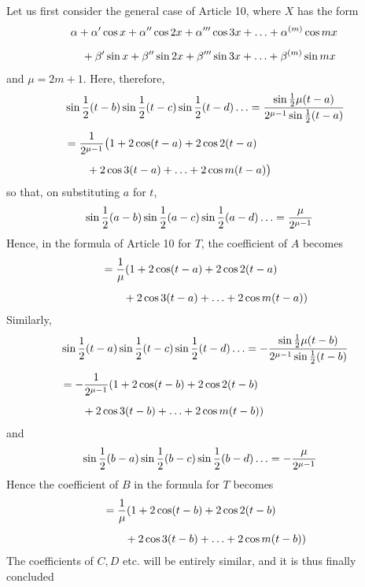 \begingroup
\renewcommand{\arraystretch}{1.45}
Let us first consider the general case of Article 10, where \(X\) has the form
\[
\begin{aligned}
&\alpha+\alpha'\cos x+\alpha''\cos2x+\alpha'''\cos3x+\mathinner{.\,.\,.}+\alpha^{(m)}\cos mx\\[5pt]
&\quad+\beta'\sin x+\beta''\sin2x+\beta'''\sin3x+\mathinner{.\,.\,.}+\beta^{(m)}\sin mx
\end{aligned}
\]
\noindent and \(\mu=2m+1\). Here, therefore,
\[
\begin{aligned}
&\sin\frac12(t-b)\sin\frac12(t-c)\sin\frac12(t-d)\mathinner{.\,.\,.}=\frac{\sin\frac12\mu(t-a)}{2^{\mu-1}\sin\frac12(t-a)}\\[5pt]
&=\frac{1}{2^{\mu-1}}\bigl(1+2\cos(t-a)+2\cos2(t-a)\\[5pt]&\qquad{}+2\cos3(t-a)+\mathinner{.\,.\,.}+2\cos m(t-a)\bigr)
\end{aligned}
\]
\noindent so that, on substituting \(a\) for \(t\),
\[
\begin{aligned}
&\sin\frac12(a-b)\sin\frac12(a-c)\sin\frac12(a-d)\mathinner{.\,.\,.}=\frac{\mu}{2^{\mu-1}}
\end{aligned}
\]
Hence, in the formula of Article 10 for \(T\), the coefficient of \(A\) becomes
\[
\begin{aligned}
&=\frac{1}{\mu}(1+2\cos(t-a)+2\cos2(t-a)\\[5pt]&\qquad{}+2\cos3(t-a)+\mathinner{.\,.\,.}+2\cos m(t-a))
\end{aligned}
\]
Similarly,
\[
\begin{aligned}
&\sin\frac12(t-a)\sin\frac12(t-c)\sin\frac12(t-d)\mathinner{.\,.\,.}
=-\frac{\sin\frac12\mu(t-b)}{2^{\mu-1}\sin\frac12(t-b)}\\[5pt]
&=-\frac{1}{2^{\mu-1}}(1+2\cos(t-b)+2\cos2(t-b)\\[5pt]&\qquad{}+2\cos3(t-b)+\mathinner{.\,.\,.}+2\cos m(t-b))
\end{aligned}
\]
and
\[
\begin{aligned}
&\sin\frac12(b-a)\sin\frac12(b-c)\sin\frac12(b-d)\mathinner{.\,.\,.}=-\frac{\mu}{2^{\mu-1}}
\end{aligned}
\]
Hence the coefficient of \(B\) in the formula for \(T\) becomes
\[
\begin{aligned}
&=\frac{1}{\mu}(1+2\cos(t-b)+2\cos2(t-b)\\[5pt]&\qquad{}+2\cos3(t-b)+\mathinner{.\,.\,.}+2\cos m(t-b))
\end{aligned}
\]
The coefficients of \(C,D\) etc. will be entirely similar, and it is thus finally concluded
